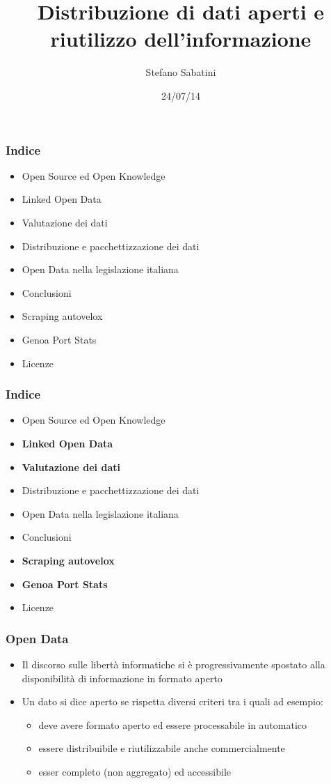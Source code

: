 \documentclass{beamer}
\begin{document}
\title{Distribuzione di dati aperti e riutilizzo dell'informazione}  
\author{Stefano Sabatini}
\date{24/07/14} 

\begin{frame}
\titlepage
\end{frame}

\begin{frame}
\frametitle{Indice}
\begin{itemize}
\item Open Source ed Open Knowledge
\item Linked Open Data
\item Valutazione dei dati
\item Distribuzione e pacchettizzazione dei dati
\item Open Data nella legislazione italiana
\item Conclusioni
\item Scraping autovelox
\item Genoa Port Stats
\item Licenze
\end{itemize}
\end{frame}

\begin{frame}
\frametitle{Indice}
\begin{itemize}
\item Open Source ed Open Knowledge
\item \textbf{Linked Open Data}
\item \textbf{Valutazione dei dati}
\item Distribuzione e pacchettizzazione dei dati
\item Open Data nella legislazione italiana
\item Conclusioni
\item \textbf{Scraping autovelox}
\item \textbf{Genoa Port Stats}
\item Licenze
\end{itemize}
\end{frame}

\begin{frame}
\frametitle{Open Data} 
\begin{itemize}
\item Il discorso sulle libertà informatiche si è progressivamente spostato alla disponibilità di informazione in formato aperto
\item Un dato si dice aperto se rispetta diversi criteri tra i quali ad esempio:
\begin{itemize}
\item deve avere formato aperto ed essere processabile in automatico
\item essere distribuibile e riutilizzabile anche commercialmente
\item esser completo (non aggregato) ed accessibile
\end{itemize} 
\end{itemize} 
\end{frame}
\end{document}
